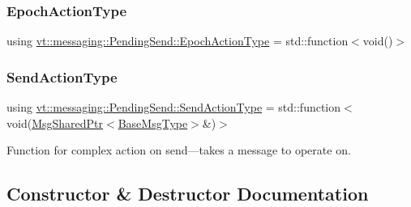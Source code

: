 \subsubsection{\texorpdfstring{Epoch\+Action\+Type}{EpochActionType}}
{\footnotesize\ttfamily using \hyperlink{structvt_1_1messaging_1_1_pending_send_a25131dc5a5e003dc65187edc97c23d1c}{vt\+::messaging\+::\+Pending\+Send\+::\+Epoch\+Action\+Type} =  std\+::function$<$void()$>$}

\mbox{\label{structvt_1_1messaging_1_1_pending_send_aa13248a342d68230048cde8e0756851c}} 
\subsubsection{\texorpdfstring{Send\+Action\+Type}{SendActionType}}
{\footnotesize\ttfamily using \hyperlink{structvt_1_1messaging_1_1_pending_send_aa13248a342d68230048cde8e0756851c}{vt\+::messaging\+::\+Pending\+Send\+::\+Send\+Action\+Type} =  std\+::function$<$void(\hyperlink{structvt_1_1messaging_1_1_msg_shared_ptr}{Msg\+Shared\+Ptr}$<$\hyperlink{namespacevt_a44d0d4e144748f2b19a1cfd962f50338}{Base\+Msg\+Type}$>$\&)$>$}



Function for complex action on send---takes a message to operate on. 



\subsection{Constructor \& Destructor Documentation}
\mbox{\label{structvt_1_1messaging_1_1_pending_send_aa4fc0c9e2fcf09df43c923ac277ed6e7}} 
